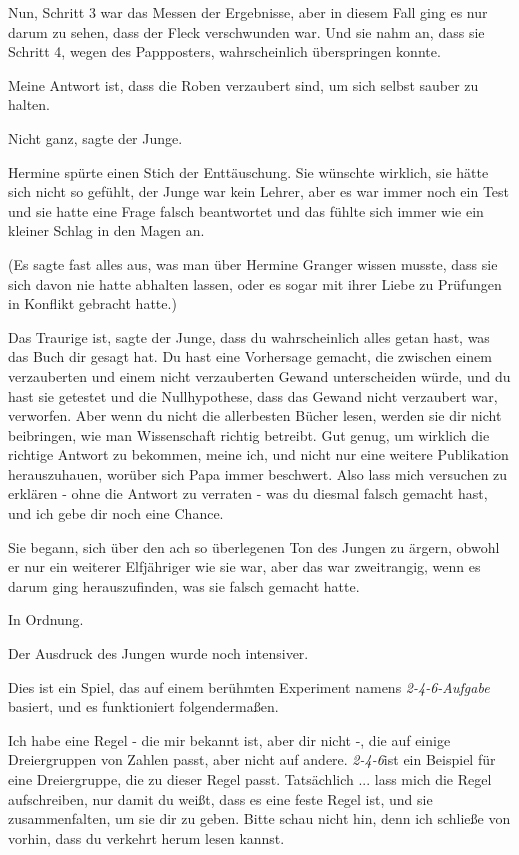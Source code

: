 Nun, Schritt 3 war das Messen der Ergebnisse, aber in diesem Fall ging es nur
darum zu sehen, dass der Fleck verschwunden war. Und sie nahm an, dass sie
Schritt 4, wegen des Pappposters, wahrscheinlich überspringen konnte.

\glqq{}Meine Antwort ist, dass die Roben verzaubert sind, um sich selbst sauber
zu halten.\grqq{}

\glqq{}Nicht ganz\grqq{}, sagte der Junge.

Hermine spürte einen Stich der Enttäuschung. Sie wünschte wirklich, sie hätte
sich nicht so gefühlt, der Junge war kein Lehrer, aber es war immer noch ein
Test und sie hatte eine Frage falsch beantwortet und das fühlte sich immer wie
ein kleiner Schlag in den Magen an.

(Es sagte fast alles aus, was man über Hermine Granger wissen musste, dass sie
sich davon nie hatte abhalten lassen, oder es sogar mit ihrer Liebe zu Prüfungen
in Konflikt gebracht hatte.)

\glqq{}Das Traurige ist\grqq{}, sagte der Junge, \glqq{}dass du wahrscheinlich
alles getan hast, was das Buch dir gesagt hat. Du hast eine Vorhersage gemacht,
die zwischen einem verzauberten und einem nicht verzauberten Gewand
unterscheiden würde, und du hast sie getestet und die Nullhypothese, dass das
Gewand nicht verzaubert war, verworfen. Aber wenn du nicht die allerbesten
Bücher lesen, werden sie dir nicht beibringen, wie man Wissenschaft richtig
betreibt. Gut genug, um wirklich die richtige Antwort zu bekommen, meine ich,
und nicht nur eine weitere Publikation herauszuhauen, worüber sich Papa immer
beschwert. Also lass mich versuchen zu erklären - ohne die Antwort zu verraten -
was du diesmal falsch gemacht hast, und ich gebe dir noch eine Chance.\grqq{}

Sie begann, sich über den ach so überlegenen Ton des Jungen zu ärgern, obwohl er
nur ein weiterer Elfjähriger wie sie war, aber das war zweitrangig, wenn es
darum ging herauszufinden, was sie falsch gemacht hatte.

\glqq{}In Ordnung.\grqq{}

Der Ausdruck des Jungen wurde noch intensiver.

\glqq{}Dies ist ein Spiel, das auf einem berühmten Experiment namens
\emph{2-4-6-Aufgabe} basiert, und es funktioniert folgendermaßen.

Ich habe eine Regel - die mir bekannt ist, aber dir nicht -, die auf einige
Dreiergruppen von Zahlen passt, aber nicht auf andere. \emph{2-4-6}ist ein
Beispiel für eine Dreiergruppe, die zu dieser Regel passt. Tatsächlich ... lass
mich die Regel aufschreiben, nur damit du weißt, dass es eine feste Regel ist,
und sie zusammenfalten, um sie dir zu geben. Bitte schau nicht hin, denn ich
schließe von vorhin, dass du verkehrt herum lesen kannst.\grqq{}

